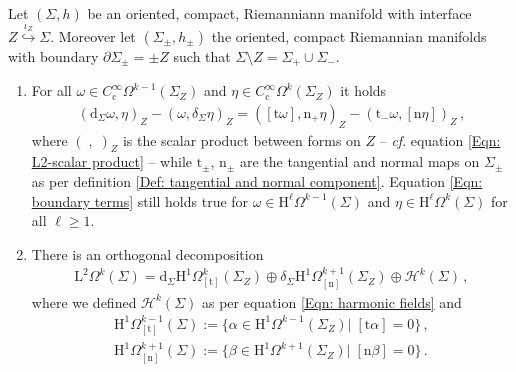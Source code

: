 \begin{theorem}\label{Thm: Hodge decomposition for manifolds with interface}
	Let $(\Sigma,h)$ be an oriented, compact, Riemanniann manifold with interface $Z\stackrel{\iota_Z}{\hookrightarrow}\Sigma$.
	Moreover let $(\Sigma_\pm,h_\pm)$ the oriented, compact Riemannian manifolds with boundary $\partial\Sigma_\pm=\pm Z$ such that $\Sigma\setminus Z=\Sigma_+\cup\Sigma_-$.
	\begin{enumerate}
		\item 
		For all $\omega\in C^{\infty}_{\mathrm{c}}\Omega^{k-1}(\Sigma_Z)$ and $\eta\in C^{\infty}_{\mathrm{c}}\Omega^k(\Sigma_Z)$ it holds
		\begin{align}\label{Eqn: boundary terms with interface}
			(\mathrm{d}_\Sigma\omega,\eta)_Z-(\omega,\delta_\Sigma\eta)_Z=
			([\mathrm{t}\omega],\mathrm{n}_+\eta)_Z-(\mathrm{t}_-\omega,[\mathrm{n}\eta])_Z\,,
		\end{align}
		where $(\;,\;)_Z$ is the scalar product between forms on $Z$ -- \textit{cf}. equation \eqref{Eqn: L2-scalar product} -- while $\mathrm{t}_\pm$, $\mathrm{n}_\pm$ are the tangential and normal maps on $\Sigma_\pm$ as per definition \ref{Def: tangential and normal component}.
		Equation \eqref{Eqn: boundary terms} still holds true for $\omega\in \mathrm{H}^\ell\Omega^{k-1}(\Sigma)$ and $\eta\in \mathrm{H}^\ell\Omega^k(\Sigma)$ for all $\ell\geq 1$.
		\item
		There is an orthogonal decomposition
		\begin{align}\label{Eqn: Hodge decomposition for manifold with interface}
			\mathrm{L}^2\Omega^k(\Sigma)=
			\mathrm{d}_\Sigma \mathrm{H}^1\Omega^k_{[\mathrm{t}]}(\Sigma_Z)\oplus
			\delta_\Sigma \mathrm{H}^1\Omega^{k+1}_{[\mathrm{n}]}(\Sigma_Z)\oplus\mathcal{H}^k(\Sigma)\,,		
		\end{align}
		where we defined $\mathcal{H}^k(\Sigma)$ as per equation \eqref{Eqn: harmonic fields} and
		\begin{align}\label{Eqn: Dirichlet and Neumann jump forms}
			\mathrm{H}^1\Omega^{k-1}_{[\mathrm{t}]}(\Sigma):=\lbrace\alpha\in \mathrm{H}^1\Omega^{k-1}(\Sigma_Z)|\;[\mathrm{t}\alpha]=0\rbrace\,,\\
			\mathrm{H}^1\Omega^{k+1}_{[\mathrm{n}]}(\Sigma):=\lbrace\beta\in \mathrm{H}^1\Omega^{k+1}(\Sigma_Z)|\;[\mathrm{n}\beta]=0\rbrace\,.
		\end{align}
	\end{enumerate}
\end{theorem}
